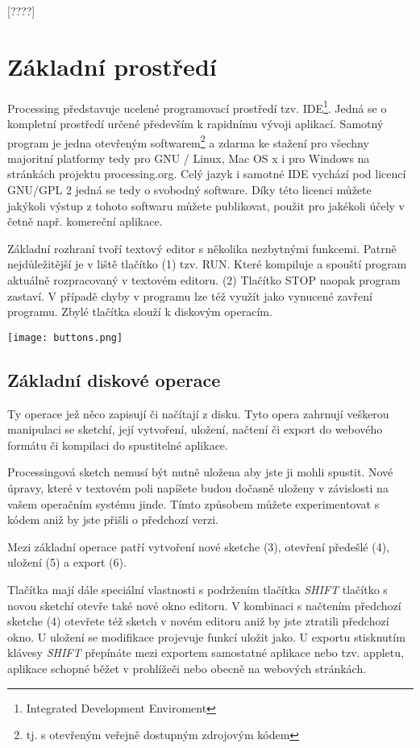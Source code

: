 \documentclass[11pt]{article} %
\begin{document}
[????]

\newpage
\section{Základní prostředí}

Processing představuje ucelené programovací prostředí tzv. IDE\footnote{Integrated Development Enviroment}. Jedná se o kompletní prostředí určené především k rapidnímu vývoji aplikací. Samotný program je jedna otevřeným softwarem\footnote{tj. s otevřeným veřejně dostupným zdrojovým kódem} a zdarma ke stažení pro všechny majoritní platformy tedy pro GNU / Linux, Mac OS x i pro Windows na stránkách projektu processing.org. Celý jazyk i samotné IDE vychází pod licencí GNU/GPL 2 jedná se tedy o svobodný software. Díky této licenci můžete jakýkoli výstup z tohoto softwaru můžete publikovat, použit pro jakékoli účely v četně např. komereční aplikace.


Základní rozhraní tvoří textový editor s několika nezbytnými funkcemi. Patrně nejdůležitější je v liště tlačítko (1) tzv. RUN. Které kompiluje a spouští program aktuálně rozpracovaný v textovém editoru. (2) Tlačítko STOP naopak program zastaví. V případě chyby v programu lze též využít jako vynucené zavření programu. Zbylé tlačítka slouží k diskovým operacím. \\


\begin{center}
\texttt{[image: buttons.png]}
\end{center}


\newpage
\subsection{Základní diskové operace}

Ty operace jež něco zapisují či načítají z disku. Tyto opera zahrnují veškerou manipulaci se sketchí, její vytvoření, uložení, načtení či export do webového formátu či kompilaci do spustitelné aplikace.

Processingová sketch nemusí být nutně uložena aby jste ji mohli spustit. Nové úpravy, které v textovém poli napíšete budou dočasně uloženy v závislosti na vašem operačním systému jinde. Tímto způsobem můžete experimentovat s kódem aniž by jste přišli o předchozí verzi.

Mezi základní operace patří vytvoření nové sketche (3), otevření předešlé (4), uložení (5) a export (6).

Tlačítka mají dále speciální vlastnosti s podržením tlačítka {\em SHIFT} tlačítko s novou sketchí otevře také nové okno editoru. V kombinaci s načtením předchozí sketche (4) otevřete též sketch v novém editoru aniž by jste ztratili předchozí okno. U uložení se modifikace projevuje funkcí uložit jako. U exportu stisknutím klávesy {\em SHIFT} přepínáte mezi exportem samostatné aplikace nebo tzv. appletu, aplikace schopné běžet v prohlížeči nebo obecně na webových stránkách.
\end{document}
